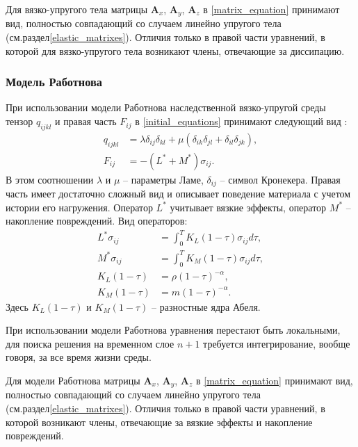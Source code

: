 Для вязко-упругого тела матрицы $\mathbf{A}_x$, $\mathbf{A}_y$, $\mathbf{A}_z$ в \ref{matrix_equation} принимают вид, полностью совпадающий со случаем линейно упругого тела (см.раздел\ref{elastic_matrixes}). Отличия только в правой части уравнений, в которой для вязко-упругого тела возникают члены, отвечающие за диссипацию.


\subsubsection{Модель Работнова}
\label{rabotnov_matrixes}

При использовании модели Работнова наследственной вязко-упругой среды тензор $q_{ijkl}$ и правая часть $F_{ij}$ в \ref{initial_equations} принимают следующий вид \cite{rabotnov, polilov}:
\begin{align}
\label{tensor_qijkl_rabotnov}
q_{ijkl}&=\lambda\delta_{ij}\delta_{kl}+\mu(\delta_{ik}\delta_{jl}+\delta_{il}
\delta_{jk}),\nonumber\\
F_{ij}&=-(L^*+M^*)\sigma_{ij}.
\end{align}
В этом соотношении $\lambda$ и $\mu$ -- параметры Ламе, $\delta_{ij}$ -- символ Кронекера. Правая часть имеет достаточно сложный вид и описывает поведение материала с учетом истории его нагружения. Оператор $L^*$ учитывает вязкие эффекты, оператор $M^*$ -- накопление повреждений. Вид операторов:
\begin{align}
\label{right_hand_rabotnov}
L^*\sigma_{ij} &= \int_0^T{K_L(1-\tau)\sigma_{ij}d\tau}, \nonumber\\
M^*\sigma_{ij} &= \int_0^T{K_M(1-\tau)\sigma_{ij}d\tau}, \nonumber\\
K_L(1-\tau)&=\rho(1-\tau)^{-\alpha}, \nonumber\\
K_M(1-\tau)&=m(1-\tau)^{-\alpha}.
\end{align}
Здесь $K_L(1-\tau)$ и $K_M(1-\tau)$ -- разностные ядра Абеля.

При использовании модели Работнова уравнения перестают быть локальными, для поиска решения на временном слое $n+1$ требуется интегрирование, вообще говоря, за все время жизни среды.

Для модели Работнова матрицы $\mathbf{A}_x$, $\mathbf{A}_y$, $\mathbf{A}_z$ в \ref{matrix_equation} принимают вид, полностью совпадающий со случаем линейно упругого тела (см.раздел\ref{elastic_matrixes}). Отличия только в правой части уравнений, в которой возникают члены, отвечающие за вязкие эффекты и накопление повреждений.

\clearpage
\newpage

